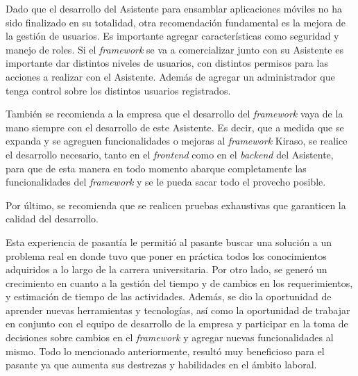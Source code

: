 Dado que el desarrollo del Asistente para ensamblar aplicaciones móviles no ha sido finalizado en su totalidad, otra recomendación fundamental es la mejora de la gestión de usuarios. Es importante agregar características como seguridad y manejo de roles. Si el \textit{framework} se va a comercializar junto con su Asistente es importante dar distintos niveles de usuarios, con distintos permisos para las acciones a realizar con el Asistente. Además de agregar un administrador que tenga control sobre los distintos usuarios registrados.

También se recomienda a la empresa que el desarrollo del \textit{framework} vaya de la mano siempre con el desarrollo de este Asistente. Es decir, que a medida que se expanda y se agreguen funcionalidades o mejoras al \textit{framework} Kiraso, se realice el desarrollo necesario, tanto en el \textit{frontend} como en el \textit{backend} del Asistente, para que de esta manera en todo momento abarque completamente las funcionalidades del \textit{framework} y se le pueda sacar todo el provecho posible.


Por último, se recomienda que se realicen pruebas exhaustivas que garanticen la calidad del desarrollo.


Esta experiencia de pasantía le permitió al pasante buscar una solución a un problema real en donde tuvo que poner en práctica todos los conocimientos adquiridos a lo largo de la carrera universitaria. Por otro lado, se generó un crecimiento en cuanto a la gestión del tiempo y de cambios en los requerimientos, y estimación de tiempo de las actividades. Además, se dio la oportunidad de aprender nuevas herramientas y tecnologías, así como la oportunidad de trabajar en conjunto con el equipo de desarrollo de la empresa y participar en la toma de decisiones sobre cambios en el \textit{framework} y agregar nuevas funcionalidades al mismo. Todo lo mencionado anteriormente, resultó muy beneficioso para el pasante ya que aumenta sus destrezas y habilidades en el ámbito laboral.

  